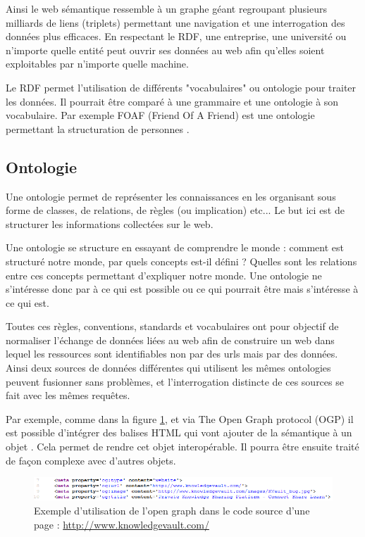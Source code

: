 Ainsi le web sémantique ressemble à un graphe géant regroupant plusieurs milliards de liens (triplets) permettant une navigation et une interrogation des données plus efficaces. En respectant le RDF, une entreprise, une université ou n'importe quelle entité peut ouvrir ses données au web afin qu'elles soient exploitables par n'importe quelle machine.

Le RDF permet l'utilisation de différents "vocabulaires" ou ontologie pour traiter les données. Il pourrait être comparé à une grammaire et une ontologie à son vocabulaire. Par exemple FOAF (Friend Of A Friend) est une ontologie permettant la structuration de personnes \cite{foaf}.

\subsection{Ontologie}

Une ontologie permet de représenter les connaissances en les organisant sous forme de classes, de relations, de règles (ou implication) etc... Le but ici est de structurer les informations collectées sur le web.

Une ontologie se structure en essayant de comprendre le monde : comment est structuré notre monde, par quels concepts est-il défini ? Quelles sont les relations entre ces concepts permettant d'expliquer notre monde. Une ontologie ne s'intéresse donc par à ce qui est possible ou ce qui pourrait être mais s'intéresse à ce qui est. \cite{shirky} \cite{schema}

Toutes ces règles, conventions, standards et vocabulaires ont pour objectif de normaliser l'échange de données liées au web afin de construire un web dans lequel les ressources sont identifiables non par des urls mais par des données. Ainsi deux sources de données différentes qui utilisent les mêmes ontologies peuvent fusionner sans problèmes, et l'interrogation distincte de ces sources se fait avec les mêmes requêtes.

Par exemple, comme dans la figure \ref{fig1}, et via The Open Graph protocol (OGP) il est possible d'intégrer des balises HTML qui vont ajouter de la sémantique à un objet \cite{ogp}. Cela permet de rendre cet objet interopérable. Il pourra être ensuite traité de façon complexe avec d'autres objets.

\begin{figure}[ht]
\centering
\includegraphics[width=\textwidth, draft=false]{imgs/og_example.PNG}
\caption{Exemple d'utilisation de l'open graph dans le code source d'une page : \url{http://www.knowledgevault.com/}}
\label{fig1}
\end{figure}

